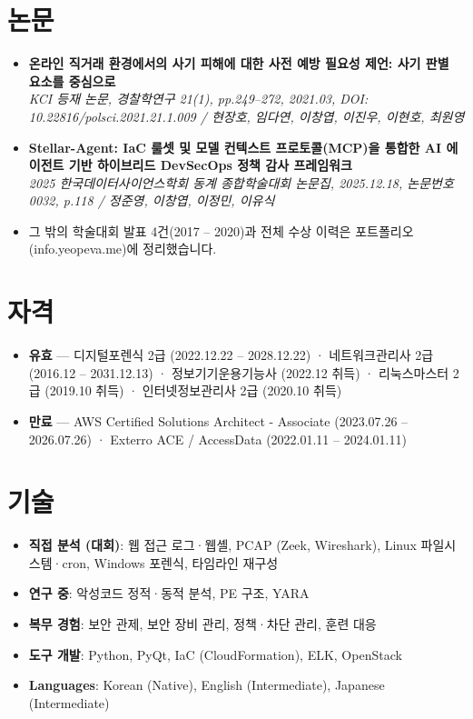 \documentclass[letterpaper,11pt]{article}
\newcommand{\resumeItem}[1]{
  \item\small{{#1 \vspace{-2pt}}}
}
\newcommand{\resumeTalk}[2]{
  \vspace{-1pt}\item
    \begin{minipage}[t]{0.97\textwidth}
      \textbf{#1} \\
      \textit{\small #2}
    \end{minipage}\vspace{-5pt}
}
\newcommand{\resumeSkill}[2]{
  \item\small{\textbf{#1}: #2}
}
\newcommand{\resumeSubHeadingListStart}{\begin{itemize}[leftmargin=*,parsep=0pt]}
\newcommand{\resumeSubHeadingListEnd}{\end{itemize}}
\begin{document}
\section{논문}
  \resumeSubHeadingListStart
    \resumeTalk{온라인 직거래 환경에서의 사기 피해에 대한 사전 예방 필요성 제언: 사기 판별 요소를 중심으로}{KCI 등재 논문, 경찰학연구 21(1), pp.249--272, 2021.03, DOI: 10.22816/polsci.2021.21.1.009 / 현장호, 임다연, 이창엽, 이진우, 이현호, 최원영}
    \resumeTalk{Stellar-Agent: IaC 룰셋 및 모델 컨텍스트 프로토콜(MCP)을 통합한 AI 에이전트 기반 하이브리드 \mbox{DevSecOps} 정책 감사 프레임워크}{2025 한국데이터사이언스학회 동계 종합학술대회 논문집, 2025.12.18, 논문번호 0032, p.118 / 정준영, 이창엽, 이정민, 이유식}
    \resumeItem{그 밖의 학술대회 발표 4건(2017 -- 2020)과 전체 수상 이력은 포트폴리오(info.yeopeva.me)에 정리했습니다.}
  \resumeSubHeadingListEnd

\section{자격}
  \resumeSubHeadingListStart
    \resumeItem{\textbf{유효} --- 디지털포렌식 2급 (2022.12.22 -- 2028.12.22) · 네트워크관리사 2급 (2016.12 -- 2031.12.13) · 정보기기운용기능사 (2022.12 취득) · 리눅스마스터 2급 (2019.10 취득) · 인터넷정보관리사 2급 (2020.10 취득)}
    \resumeItem{\textbf{만료} --- AWS Certified Solutions Architect - Associate (2023.07.26 -- 2026.07.26) · Exterro ACE / AccessData (2022.01.11 -- 2024.01.11)}
  \resumeSubHeadingListEnd

\section{기술}
  \resumeSubHeadingListStart
    \resumeSkill{직접 분석 (대회)}{웹 접근 로그·웹셸, PCAP (Zeek, Wireshark), Linux 파일시스템·cron, Windows 포렌식, 타임라인 재구성}
    \resumeSkill{연구 중}{악성코드 정적·동적 분석, PE 구조, YARA}
    \resumeSkill{복무 경험}{보안 관제, 보안 장비 관리, 정책·차단 관리, 훈련 대응}
    \resumeSkill{도구 개발}{Python, PyQt, IaC (CloudFormation), ELK, OpenStack}
    \resumeSkill{Languages}{Korean (Native), English (Intermediate), Japanese (Intermediate)}
  \resumeSubHeadingListEnd
\end{document}

